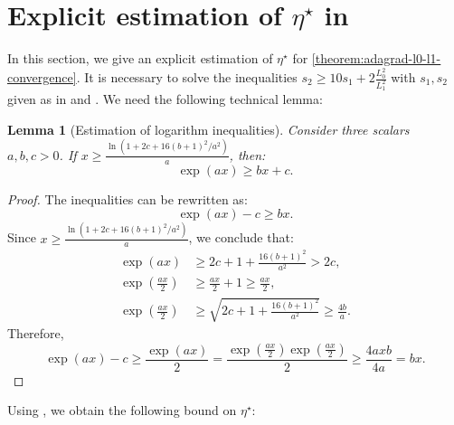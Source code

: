 \documentclass{article}
\theoremstyle{plain}
\newtheorem{lemma}[theorem]{Lemma}
\theoremstyle{definition}
\theoremstyle{remark}
\begin{document}
\section{Explicit estimation of $\eta^\star$ in }

In this section, we give an explicit estimation of $\eta^\star$
for \cref{theorem:adagrad-l0-l1-convergence}.
It is necessary to solve the inequalities $s_2 \geq 10s_1 + 2\frac{L_0^2}{L_1^2}$ with $s_1, s_2$ given as in  and .
We need the following technical lemma:

\begin{lemma}[Estimation of logarithm inequalities]
    \label{lemma:technical-estimation}
    Consider three scalars $a, b, c > 0$. If $x \geq \frac{\ln (1 + 2c + 16(b+1)^2/a^2)}{a}$, then:
    \begin{equation*}
        \exp(ax) \geq bx + c.
    \end{equation*}
\end{lemma}
\begin{proof}
    The inequalities can be rewritten as:
    \begin{equation*}
        \exp(ax) - c \geq bx.
    \end{equation*}
    Since $x \geq \frac{\ln(1 + 2c + 16(b+1)^2/a^2)}{a}$, we conclude that:
    \begin{equation*}
        \begin{aligned}
            \exp(ax) &\geq 2c + 1 + \frac{16(b+1)^2}{a^2}> 2c,\\
            \exp\left(\frac{ax}{2}\right) &\geq \frac{ax}{2} + 1 \geq \frac{ax}{2},\\
            \exp\left(\frac{ax}{2}\right) &\geq \sqrt{2c + 1 + \frac{16(b+1)^2}{a^2}} \geq \frac{4b}{a}.
        \end{aligned}
    \end{equation*}
    Therefore,
    \begin{equation*}
    \exp(ax) - c \geq \frac{\exp(ax)}{2} =  \frac{\exp\left(\frac{ax}{2}\right)\exp\left(\frac{ax}{2}\right)}{2} \geq \frac{4axb}{4a} = bx.
    \end{equation*}
\end{proof}
Using , we obtain the following bound on $\eta^\star$:
\end{document}
